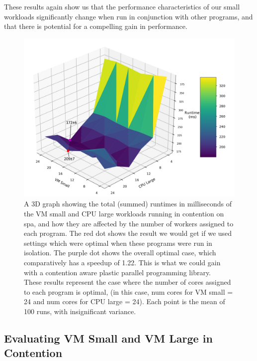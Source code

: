 These results again show us that the performance characteristics of our small workloads significantly change when run in conjunction with other programs, and that there is potential for a compelling gain in performance.



\begin{figure}[H]
    \includegraphics[width=1\textwidth]{graphics/contention/spa/otwc_vm_small_and_cpu_large.png}
    \caption{A 3D graph showing the total (summed) runtimes in milliseconds of the VM small and CPU large workloads running in contention on spa, and how they are affected by the number of workers assigned to each program. The red dot shows the result we would get if we used settings which were optimal when these programs were run in isolation. The purple dot shows the overall optimal case, which comparatively has a speedup of 1.22. This is what we could gain with a contention aware plastic parallel programming library. \\
    These results represent the case where the number of cores assigned to each program is optimal, (in this case, num cores for VM small = 24 and num cores for CPU large = 24). Each point is the mean of 100 runs, with insignificant variance.}
    \label{fig:con_spa_vm_small_and_cpu_large}
\end{figure}



\subsection{Evaluating VM Small and VM Large in Contention}
\label{section:results:evaluating_vm_small_and_vm_large_in_contention}

